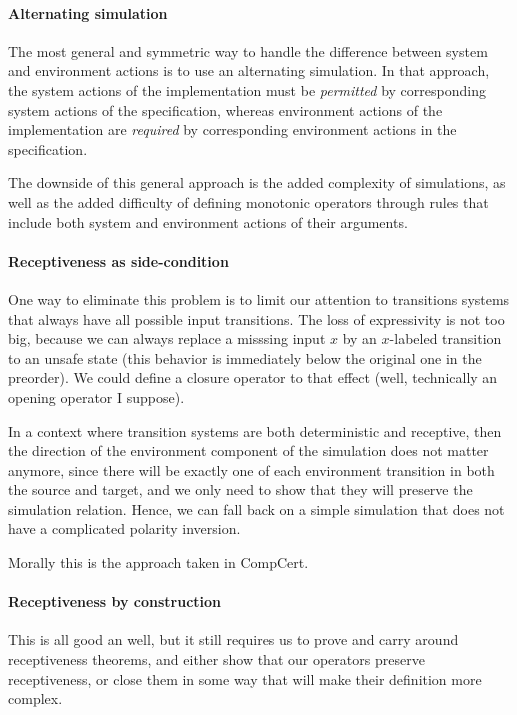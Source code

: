 \documentclass[11pt]{article}
\begin{document}
\paragraph{Alternating simulation}

The most general and symmetric way to
handle the difference between system and environment actions
is to use an alternating simulation.
In that approach,
the system actions of the implementation must be \emph{permitted}
by corresponding system actions of the specification,
whereas environment actions of the implementation are \emph{required}
by corresponding environment actions in the specification.

The downside of this general approach is
the added complexity of simulations,
as well as the added difficulty of defining
monotonic operators
through rules that include
both system and environment actions
of their arguments.

\paragraph{Receptiveness as side-condition}

One way to eliminate this problem is to limit our attention to
transitions systems that always have all possible input transitions.
The loss of expressivity is not too big,
because we can always replace a misssing input $x$
by an $x$-labeled transition to an unsafe state
(this behavior is immediately below the original one in the preorder).
We could define a closure operator to that effect
(well, technically an opening operator I suppose).

In a context where transition systems are
both deterministic and receptive,
then the direction of the environment component of the simulation
does not matter anymore,
since there will be exactly one of each environment transition
in both the source and target,
and we only need to show that they will preserve
the simulation relation.
Hence, we can fall back on a simple simulation
that does not have a complicated polarity inversion.

Morally this is the approach taken in CompCert.

\paragraph{Receptiveness by construction}

This is all good an well,
but it still requires us to prove and carry around
receptiveness theorems,
and either show that our operators preserve receptiveness,
or close them in some way that will make their definition more complex.
\end{document}

